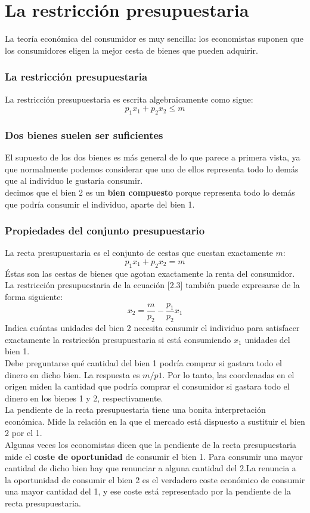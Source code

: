 \documentclass[10pt]{article}
\begin{document}
\part*{\center La restricción presupuestaria}
La teoría económica del consumidor es muy sencilla: los economistas suponen que los consumidores eligen la mejor cesta de bienes que pueden adquirir.\\
\section*{La restricción presupuestaria}
La restricción presupuestaria es escrita algebraicamente como sigue:
$$p_1 x_1 + p_2 x_2 \leq m$$
\section*{Dos bienes suelen ser suficientes}
El supuesto de los dos bienes es más general de lo que parece a primera vista, ya que normalmente podemos considerar que uno de ellos representa todo lo demás que al individuo le gustaría consumir.\\
decimos que el bien 2 es un \textbf{bien compuesto} porque representa todo lo demás que podría consumir el individuo, aparte del bien 1. 
\section*{Propiedades del conjunto presupuestario}
La recta presupuestaria es el conjunto de cestas que cuestan exactamente $m$: $$p_1 x_1 + p_2 x_2 = m$$
Éstas son las cestas de bienes que agotan exactamente la renta del consumidor.\\
La restricción presupuestaria de la ecuación [2.3] también puede expresarse de la forma siguiente:
$$x_2=\dfrac{m}{p_2}-\dfrac{p_1}{p_2} x_1$$
Indica cuántas unidades del bien 2 necesita consumir el individuo para satisfacer exactamente la restricción presupuestaria si está consumiendo $x_1$ unidades del bien 1.\\
Debe preguntarse qué cantidad del bien 1 podría comprar si gastara todo el dinero en dicho bien. La respuesta es $m/p1$. Por lo tanto, las coordenadas en el origen miden la cantidad que podría comprar el consumidor si gastara todo el dinero en los bienes 1 y 2, respectivamente.\\
La pendiente de la recta presupuestaria tiene una bonita interpretación económica. Mide la relación en la que el mercado está dispuesto a sustituir el bien 2 por el 1.\\
Algunas veces los economistas dicen que la pendiente de la recta presupuestaria mide el\textbf{ coste de oportunidad} de consumir el bien 1. Para consumir una mayor cantidad de dicho bien hay que renunciar a alguna cantidad del 2.La renuncia a la oportunidad de consumir el bien 2 es el verdadero coste económico de consumir una mayor cantidad del 1, y ese coste está representado por la pendiente de la recta presupuestaria.
\end{document}
